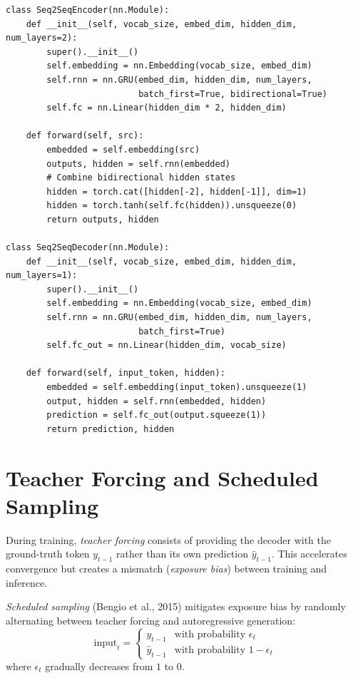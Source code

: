 \begin{codeblock}[title=\textbf{Seq2Seq encoder-decoder}]
\begin{verbatim}
class Seq2SeqEncoder(nn.Module):
    def __init__(self, vocab_size, embed_dim, hidden_dim, num_layers=2):
        super().__init__()
        self.embedding = nn.Embedding(vocab_size, embed_dim)
        self.rnn = nn.GRU(embed_dim, hidden_dim, num_layers,
                          batch_first=True, bidirectional=True)
        self.fc = nn.Linear(hidden_dim * 2, hidden_dim)

    def forward(self, src):
        embedded = self.embedding(src)
        outputs, hidden = self.rnn(embedded)
        # Combine bidirectional hidden states
        hidden = torch.cat([hidden[-2], hidden[-1]], dim=1)
        hidden = torch.tanh(self.fc(hidden)).unsqueeze(0)
        return outputs, hidden

class Seq2SeqDecoder(nn.Module):
    def __init__(self, vocab_size, embed_dim, hidden_dim, num_layers=1):
        super().__init__()
        self.embedding = nn.Embedding(vocab_size, embed_dim)
        self.rnn = nn.GRU(embed_dim, hidden_dim, num_layers,
                          batch_first=True)
        self.fc_out = nn.Linear(hidden_dim, vocab_size)

    def forward(self, input_token, hidden):
        embedded = self.embedding(input_token).unsqueeze(1)
        output, hidden = self.rnn(embedded, hidden)
        prediction = self.fc_out(output.squeeze(1))
        return prediction, hidden
\end{verbatim}
\end{codeblock}

\section{Teacher Forcing and Scheduled Sampling}
\label{sec:seq:teacher}

\begin{definition}
During training, \emph{teacher forcing} consists of providing the decoder with
the ground-truth token $y_{t-1}$ rather than its own prediction
$\hat{y}_{t-1}$. This accelerates convergence but creates a mismatch
(\emph{exposure bias}) between training and inference.
\end{definition}

\begin{definition}
\emph{Scheduled sampling} (Bengio et al., 2015) mitigates exposure bias by
randomly alternating between teacher forcing and autoregressive generation:
\[
\text{input}_t = \begin{cases}
y_{t-1} & \text{with probability } \epsilon_t \\
\hat{y}_{t-1} & \text{with probability } 1 - \epsilon_t
\end{cases}
\]
where $\epsilon_t$ gradually decreases from $1$ to $0$.
\end{definition}

